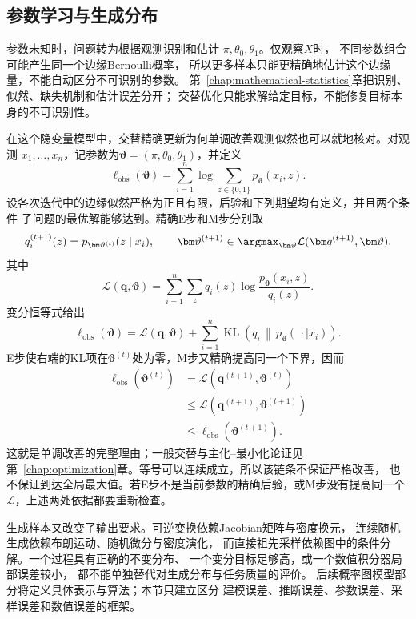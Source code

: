 \subsection{参数学习与生成分布}
\label{sec:future-parameter-estimation-sample-generation}

参数未知时，问题转为根据观测识别和估计
$\pi,\theta_0,\theta_1$。仅观察$X$时，
不同参数组合可能产生同一个边缘Bernoulli概率，
所以更多样本只能更精确地估计这个边缘量，不能自动区分不可识别的参数。
第~\ref{chap:mathematical-statistics}章把识别、似然、缺失机制和估计误差分开；
交替优化只能求解给定目标，不能修复目标本身的不可识别性。

在这个隐变量模型中，交替精确更新为何单调改善观测似然也可以就地核对。对观测
\(x_1,\ldots,x_n\)，记参数为\(\bm\vartheta=(\pi,\theta_0,\theta_1)\)，并定义
\[
  \ell_{\mathrm{obs}}(\bm\vartheta)
  =
  \sum_{i=1}^{n}
  \log\sum_{z\in\{0,1\}}
  p_{\bm\vartheta}(x_i,z).
\]
设各次迭代中的边缘似然严格为正且有限，后验和下列期望均有定义，并且两个条件
子问题的最优解能够达到。精确E步和M步分别取
\[
  q_i^{(t+1)}(z)
  =
  p_{\bm\vartheta^{(t)}}(z\mid x_i),
  \qquad
  \bm\vartheta^{(t+1)}
  \in
  \argmax_{\bm\vartheta}
  \mathcal L(\bm q^{(t+1)},\bm\vartheta),
\]
其中
\[
  \mathcal L(\bm q,\bm\vartheta)
  =
  \sum_{i=1}^{n}\sum_z
  q_i(z)
  \log
  \frac{p_{\bm\vartheta}(x_i,z)}{q_i(z)}.
\]
变分恒等式给出
\[
  \ell_{\mathrm{obs}}(\bm\vartheta)
  =
  \mathcal L(\bm q,\bm\vartheta)
  +
  \sum_{i=1}^{n}
  \operatorname{KL}\!\left(
    q_i\,\middle\|\,
    p_{\bm\vartheta}(\,\cdot\mid x_i)
  \right).
\]
E步使右端的KL项在\(\bm\vartheta^{(t)}\)处为零，M步又精确提高同一个下界，因而
\begin{align*}
  \ell_{\mathrm{obs}}(\bm\vartheta^{(t)})
  &=
  \mathcal L(\bm q^{(t+1)},\bm\vartheta^{(t)})
  \\
  &\leq
  \mathcal L(\bm q^{(t+1)},\bm\vartheta^{(t+1)})
  \\
  &\leq
  \ell_{\mathrm{obs}}(\bm\vartheta^{(t+1)}).
\end{align*}
这就是单调改善的完整理由；一般交替与主化--最小化论证见
第~\ref{chap:optimization}章。等号可以连续成立，所以该链条不保证严格改善，
也不保证到达全局最大值。若E步不是当前参数的精确后验，或M步没有提高同一个
\(\mathcal L\)，上述两处依据都要重新检查。

生成样本又改变了输出要求。可逆变换依赖Jacobian矩阵与密度换元，
连续随机生成依赖布朗运动、随机微分与密度演化，
而直接祖先采样依赖图中的条件分解。一个过程具有正确的不变分布、
一个变分目标足够高，或一个数值积分器局部误差较小，
都不能单独替代对生成分布与任务质量的评价。
后续概率图模型部分将定义具体表示与算法；本节只建立区分
建模误差、推断误差、参数误差、采样误差和数值误差的框架。

